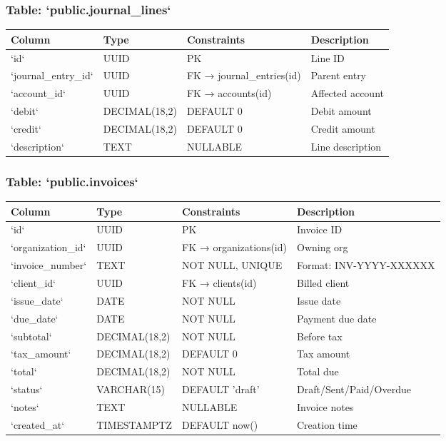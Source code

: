 \documentclass[journal, a4paper, onecolumn, 12pt]{IEEEtran}
\begin{document}
\subsubsection{Table: `public.journal\_lines`}
\begin{longtable}{|p{}|p{}|p{}|p{}|}
\hline
Column & Type & Constraints & Description \\ \hline
\hline
`id` & UUID & PK & Line ID \\ \hline
`journal\_entry\_id` & UUID & FK → journal\_entries(id) & Parent entry \\ \hline
`account\_id` & UUID & FK → accounts(id) & Affected account \\ \hline
`debit` & DECIMAL(18,2) & DEFAULT 0 & Debit amount \\ \hline
`credit` & DECIMAL(18,2) & DEFAULT 0 & Credit amount \\ \hline
`description` & TEXT & NULLABLE & Line description \\ \hline
\end{longtable}
\subsubsection{Table: `public.invoices`}
\begin{longtable}{|p{}|p{}|p{}|p{}|}
\hline
Column & Type & Constraints & Description \\ \hline
\hline
`id` & UUID & PK & Invoice ID \\ \hline
`organization\_id` & UUID & FK → organizations(id) & Owning org \\ \hline
`invoice\_number` & TEXT & NOT NULL, UNIQUE & Format: INV-YYYY-XXXXXX \\ \hline
`client\_id` & UUID & FK → clients(id) & Billed client \\ \hline
`issue\_date` & DATE & NOT NULL & Issue date \\ \hline
`due\_date` & DATE & NOT NULL & Payment due date \\ \hline
`subtotal` & DECIMAL(18,2) & NOT NULL & Before tax \\ \hline
`tax\_amount` & DECIMAL(18,2) & DEFAULT 0 & Tax amount \\ \hline
`total` & DECIMAL(18,2) & NOT NULL & Total due \\ \hline
`status` & VARCHAR(15) & DEFAULT 'draft' & Draft/Sent/Paid/Overdue \\ \hline
`notes` & TEXT & NULLABLE & Invoice notes \\ \hline
`created\_at` & TIMESTAMPTZ & DEFAULT now() & Creation time \\ \hline
\end{longtable}
\end{document}
